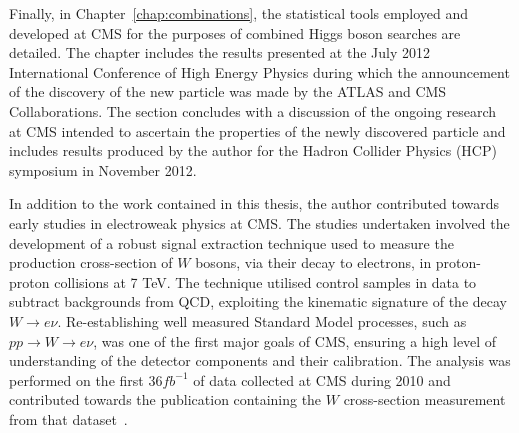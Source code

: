 Finally, in Chapter~\ref{chap:combinations}, the statistical tools employed and developed
at CMS for the purposes of combined Higgs boson searches are detailed. The chapter includes 
the results presented at the July 2012 International Conference of High Energy Physics during which 
the announcement of the discovery of the new particle was made by the ATLAS and CMS Collaborations.
The section concludes with a discussion of the ongoing research at CMS intended to ascertain the properties of 
the newly discovered particle and includes results produced by the author for the Hadron Collider Physics (HCP)
symposium in November 2012.  

In addition to the work contained in this thesis, the author contributed towards early studies
in electroweak physics at CMS. The studies undertaken involved the development of a 
robust signal extraction technique used to measure the production cross-section of $W$ bosons,
via their decay to electrons, in proton-proton collisions at 7 TeV. 
The technique utilised control samples in data to subtract backgrounds from QCD, exploiting the kinematic
signature of the decay $W\rightarrow e\nu$. 
Re-establishing well measured Standard Model processes, such as $pp\rightarrow W\rightarrow e\nu$,
was one of the first major goals of CMS, ensuring a high level of understanding of the detector components
and their calibration. The analysis was performed on the first 36$fb^{-1}$ of 
data collected at CMS during 2010 and contributed towards the publication containing the $W$ cross-section
measurement from that dataset~\citep{EWK-11-001,AN-11-009}.  


